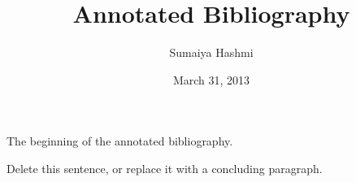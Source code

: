 \documentclass[finalcopy,short]{srpaper}
\title{Annotated Bibliography}
\author{Sumaiya Hashmi}
\date{March 31, 2013}
\begin{document}
\frontmatter

The beginning of the annotated bibliography.
\nocite{*}

Delete this sentence, or replace it with a concluding paragraph.
\end{document}
